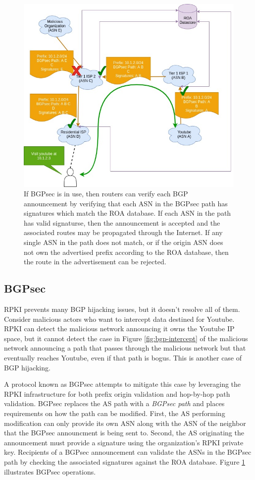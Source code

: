 \documentclass[conference]{IEEEtran}
\begin{document}
\begin{figure}[hp]
  \includegraphics[width=\linewidth]{images/bgpsec-ops.jpg}
  \caption{If BGPsec is in use, then routers can verify each BGP announcement by verifying that each ASN in the BGPsec path has signatures which match the ROA database.  If each ASN in the path has valid signaturse, then the announcement is accepted and the associated routes may be propagated through the Internet.  If any single ASN in the path does not match, or if the origin ASN does not own the advertised prefix according to the ROA database, then the route in the advertisement can be rejected.}
  \label{fig:bgpsec-ops}
\end{figure}

\subsection{BGPsec}
RPKI prevents many BGP hijacking issues, but it doesn't resolve all of them.  Consider malicious actors who want to intercept data destined for Youtube.  RPKI can detect the malicious network announcing it owns the Youtube IP space, but it cannot detect the case in Figure \ref{fig:bgp-intercept} of the malicious network announcing a path that passes through the malicious network but that eventually reaches Youtube, even if that path is bogus.  This is another case of BGP hijacking. 

A protocol known as BGPsec attempts to mitigate this case by leveraging the RPKI infrastructure for both prefix origin validation and hop-by-hop path validation.  BGPsec replaces the AS path with a \emph{BGPsec path} and places requirements on how the path can be modified.  First, the AS performing modification can only provide its own ASN along with the ASN of the neighbor that the BGPsec announcment is being sent to.  Second, the AS originating the announcement must provide a signature using the organization's RPKI private key.  Recipients of a BGPsec announcement can validate the ASNs in the BGPsec path by checking the associated signatures against the ROA database.  Figure \ref{fig:bgpsec-ops} illustrates BGPsec operations.
\end{document}
